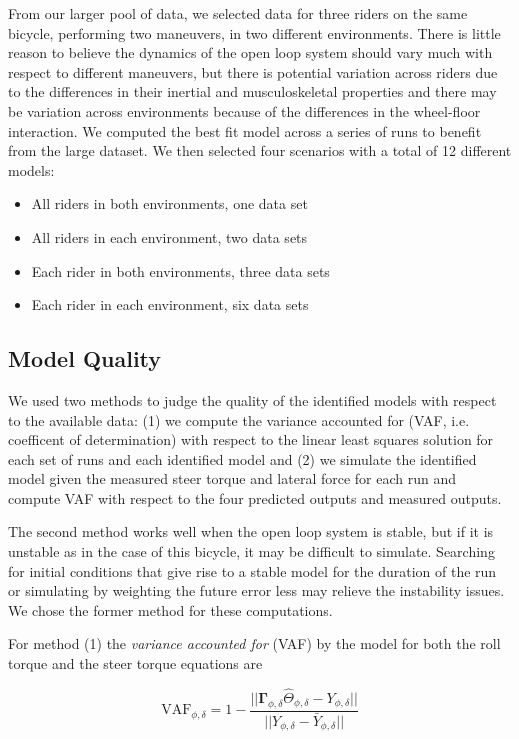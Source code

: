 \documentclass[a4paper]{article}
\begin{document}
From our larger pool of data, we selected data for three riders on the same
bicycle, performing two maneuvers, in two different environments. There is
little reason to believe the dynamics of the open loop system should vary much
with respect to different maneuvers, but there is potential variation across
riders due to the differences in their inertial and musculoskeletal properties
and there may be variation across environments because of the differences in
the wheel-floor interaction. We computed the best fit model across a series
of runs to benefit from the large dataset. We then selected four scenarios with
a total of 12 different models:
\begin{itemize}
  \item
    All riders in both environments, one data set
  \item
    All riders in each environment, two data sets
  \item
    Each rider in both environments, three data sets
  \item
    Each rider in each environment, six data sets
\end{itemize}

\subsection{Model Quality}

We used two methods to judge the quality
of the identified models with respect to the available data: (1) we compute the
variance accounted for (VAF, i.e. coefficent of determination) with respect to
the linear least squares solution for each set of runs and each identified model
and (2) we simulate the identified model given the measured steer torque and
lateral force for each run and compute VAF with respect to the four predicted
outputs and measured outputs.

The second method works well when the open loop system is stable, but if it is
unstable as in the case of this bicycle, it may be difficult to simulate.
Searching for initial conditions that give rise to a stable model for the
duration of the run or simulating by weighting the future error less may
relieve the instability issues. We chose the former method for these
computations.

For method (1) the \emph{variance accounted for} (VAF) by the model for both
the roll torque and the steer torque equations are

\begin{equation}
  \label{eq:vaf}
  \textrm{VAF}_{\phi,\delta} = 1 - \frac{\vert \vert
    \mathbf{\Gamma}_{\phi,\delta}\hat{\Theta}_{\phi,\delta} - Y_{\phi,\delta} \vert \vert}
                            {\vert \vert Y_{\phi,\delta} - \bar{Y}_{\phi,\delta} \vert \vert}
\end{equation}
\end{document}
